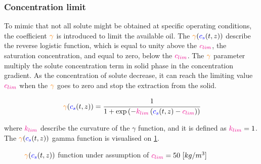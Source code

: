 \documentclass[../Article_Model_Parameters.tex]{subfiles}
\begin{document}
	
	\subsubsection{Concentration limit}
	
	To mimic that not all solute might be obtained at specific operating conditions, the coefficient ${\color{orange} \gamma}$ is introduced to limit the available oil. The ${\color{orange} \gamma}({\color{blue} c_s} (t,z))$ describe the reverse logistic function, which is equal to unity above the ${\color{magenta} c_{lim}}$, the saturation concentration, and equal to zero, below the ${\color{magenta} c_{lim}}$. The ${\color{orange} \gamma}$ parameter multiply the solute concentration term in solid phase in the concentration gradient. As the concentration of solute decrease, it can reach the limiting value ${\color{magenta} c_{lim}}$ when the ${\color{orange} \gamma}$ goes to zero and stop the extraction from the solid.
			
	{\footnotesize
		\begin{equation}
			{\color{orange} \gamma}({\color{blue} c_s} (t,z)) = \cfrac{1}{1+\exp \left( -{\color{magenta} k_{lim}} \left( {\color{blue} c_s} (t,z) - {\color{magenta} c_{lim}} \right) \right) }
			\label{EQ: C_sat_function}
			\end{equation}
	}
			
	where ${\color{magenta} k_{lim}}$ describe the curvature of the $\gamma$ function, and it is defined as ${\color{magenta} k_{lim}} = 1$. %
	The ${\color{orange} \gamma}({\color{blue} c_s} (t,z))$ gamma function is visualised on \ref{fig: Gamma_function}.
			
	\begin{figure}[h!]
		\centering
			\caption{${\color{orange} \gamma}({\color{blue} c_s} (t,z))$ function under assumption of ${\color{magenta} c_{lim}}=50~[kg/m^3]$}
			\label{fig: Gamma_function}
	\end{figure}
			
\end{document}
